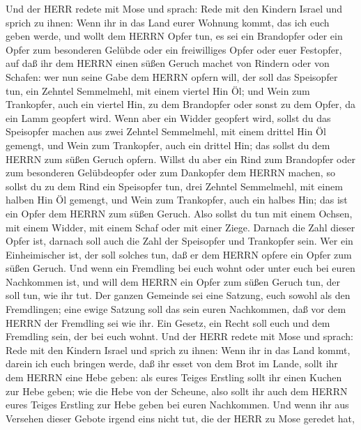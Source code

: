  Und der HERR redete mit Mose und sprach:  Rede
mit den Kindern Israel und sprich zu ihnen: Wenn ihr in das Land eurer
Wohnung kommt, das ich euch geben werde,  und wollt dem
HERRN Opfer tun, es sei ein Brandopfer oder ein Opfer zum besonderen
Gelübde oder ein freiwilliges Opfer oder euer Festopfer, auf daß ihr dem
HERRN einen süßen Geruch machet von Rindern oder von Schafen:
 wer nun seine Gabe dem HERRN opfern will, der soll das
Speisopfer tun, ein Zehntel Semmelmehl, mit einem viertel Hin Öl;
 und Wein zum Trankopfer, auch ein viertel Hin, zu dem
Brandopfer oder sonst zu dem Opfer, da ein Lamm geopfert wird.
 Wenn aber ein Widder geopfert wird, sollst du das
Speisopfer machen aus zwei Zehntel Semmelmehl, mit einem drittel Hin Öl
gemengt,  und Wein zum Trankopfer, auch ein drittel Hin; das
sollst du dem HERRN zum süßen Geruch opfern.  Willst du aber
ein Rind zum Brandopfer oder zum besonderen Gelübdeopfer oder zum
Dankopfer dem HERRN machen,  so sollst du zu dem Rind ein
Speisopfer tun, drei Zehntel Semmelmehl, mit einem halben Hin Öl
gemengt,  und Wein zum Trankopfer, auch ein halbes Hin; das
ist ein Opfer dem HERRN zum süßen Geruch.  Also sollst du
tun mit einem Ochsen, mit einem Widder, mit einem Schaf oder mit einer
Ziege.  Darnach die Zahl dieser Opfer ist, darnach soll
auch die Zahl der Speisopfer und Trankopfer sein.  Wer ein
Einheimischer ist, der soll solches tun, daß er dem HERRN opfere ein
Opfer zum süßen Geruch.  Und wenn ein Fremdling bei euch
wohnt oder unter euch bei euren Nachkommen ist, und will dem HERRN ein
Opfer zum süßen Geruch tun, der soll tun, wie ihr tut.  Der
ganzen Gemeinde sei eine Satzung, euch sowohl als den Fremdlingen; eine
ewige Satzung soll das sein euren Nachkommen, daß vor dem HERRN der
Fremdling sei wie ihr.  Ein Gesetz, ein Recht soll euch und
dem Fremdling sein, der bei euch wohnt.  Und der HERR
redete mit Mose und sprach:  Rede mit den Kindern Israel
und sprich zu ihnen: Wenn ihr in das Land kommt, darein ich euch bringen
werde,  daß ihr esset von dem Brot im Lande, sollt ihr dem
HERRN eine Hebe geben:  als eures Teiges Erstling sollt ihr
einen Kuchen zur Hebe geben; wie die Hebe von der Scheune, 
also sollt ihr auch dem HERRN eures Teiges Erstling zur Hebe geben bei
euren Nachkommen.  Und wenn ihr aus Versehen dieser Gebote
irgend eins nicht tut, die der HERR zu Mose geredet hat, 
